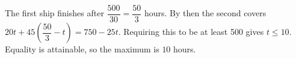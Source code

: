 The first ship finishes after $\dfrac{500}{30}=\dfrac{50}{3}$ hours. By then the second covers $ 20t+45(\dfrac{50}{3}-t)=750-25t $. Requiring this to be at least 500 gives $ t\le10 $. Equality is attainable, so the maximum is $\boxed{10}$ hours.
